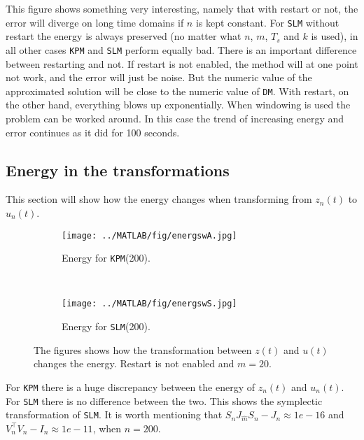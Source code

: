\noindent This figure shows something very interesting, namely that with restart or not, the error will diverge on long time domains if $n$ is kept constant. For \texttt{SLM} without restart the energy is always preserved (no matter what $n$, $m$, $T_s$ and $k$ is used), in all other cases \texttt{KPM} and \texttt{SLM} perform equally bad. There is an important difference between restarting and not. If restart is not enabled, the method will at one point not work, and the error will just be noise. But the numeric value of the approximated solution will be close to the numeric value of \texttt{DM}. With restart, on the other hand, everything blows up exponentially. When windowing is used the problem can be worked around. In this case the trend of increasing energy and error continues as it did for 100 seconds. \\

\subsection{Energy in the transformations}%
This section will show how the energy changes when transforming from $z_n(t)$ to $u_n(t)$.

\begin{figure}[H]
        \centering
        \begin{subfigure}[b]{0.3\textwidth}
                \texttt{[image: ../MATLAB/fig/energswA.jpg]}
                \caption{ Energy for \texttt{KPM}(200). }
                \label{fig:energyswA}
        \end{subfigure}
        ~
		\begin{subfigure}[b]{0.3\textwidth}
                \texttt{[image: ../MATLAB/fig/energswS.jpg]}
                \caption{ Energy for \texttt{SLM}(200). }
                \label{fig:energswS}
        \end{subfigure}        
        \caption{ The figures shows how the transformation between $z(t)$ and $u(t)$ changes the energy. Restart is not enabled and $m = 20$. }
        \label{fig:energs}
\end{figure}
\noindent For \texttt{KPM} there is a huge discrepancy between the energy of $z_{n}(t)$ and $u_{n}(t)$. For \texttt{SLM} there is no difference between the two. This shows the symplectic transformation of \texttt{SLM}. It is worth mentioning that $S_n J_{\hat{m}}S_n - J_n \approx 1e-16$ and $V_n^\top V_n - I_n \approx 1e-11$, when $n = 200$.
